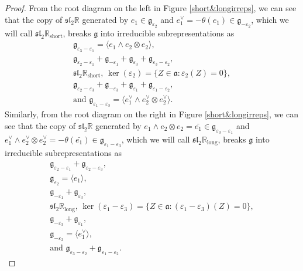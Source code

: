 \documentclass[12pt,a4paper]{amsart}
\theoremstyle{definition}
\begin{document}
\begin{proof}From the root diagram on the left in Figure \ref{short&longirreps}, we can see that the copy of $\mathfrak{sl}_2\mathbb{R}$ generated by $e_1\in\mathfrak{g}_{\varepsilon_2}$ and $e_1^\vee=-\theta(e_1)\in\mathfrak{g}_{-\varepsilon_2}$, which we will call $\mathfrak{sl}_2\mathbb{R}_\text{short}$, breaks $\mathfrak{g}$ into irreducible subrepresentations as
\begin{gather*}\mathfrak{g}_{\varepsilon_3-\varepsilon_1}=\langle e_1\wedge e_2\otimes e_2\rangle, \\
\mathfrak{g}_{\varepsilon_2-\varepsilon_1}+\mathfrak{g}_{-\varepsilon_1}+\mathfrak{g}_{\varepsilon_3}+\mathfrak{g}_{\varepsilon_3-\varepsilon_2}, \\
\mathfrak{sl}_2\mathbb{R}_\text{short},\, \ker(\varepsilon_2)=\{Z\in\mathfrak{a}:\varepsilon_2(Z)=0\}, \\
\mathfrak{g}_{\varepsilon_2-\varepsilon_3}+\mathfrak{g}_{-\varepsilon_3}+\mathfrak{g}_{\varepsilon_1}+\mathfrak{g}_{\varepsilon_1-\varepsilon_2}, \\
\text{and }\mathfrak{g}_{\varepsilon_1-\varepsilon_3}=\langle e_1^\vee\wedge e_2^\vee\otimes e_2^\vee\rangle.\end{gather*}
Similarly, from the root diagram on the right in Figure \ref{short&longirreps}, we can see that the copy of $\mathfrak{sl}_2\mathbb{R}$ generated by $e_1\wedge e_2\otimes e_2=\bar{e_1}\in\mathfrak{g}_{\varepsilon_3-\varepsilon_1}$ and $e_1^\vee\wedge e_2^\vee\otimes e_2^\vee=-\theta(\bar{e_1})\in\mathfrak{g}_{\varepsilon_1-\varepsilon_3}$, which we will call $\mathfrak{sl}_2\mathbb{R}_\text{long}$, breaks $\mathfrak{g}$ into irreducible subrepresentations as
\begin{gather*}\mathfrak{g}_{\varepsilon_2-\varepsilon_1}+\mathfrak{g}_{\varepsilon_2-\varepsilon_3}, \\
\mathfrak{g}_{\varepsilon_2}=\langle e_1\rangle, \\
\mathfrak{g}_{-\varepsilon_1}+\mathfrak{g}_{\varepsilon_3}, \\
\mathfrak{sl}_2\mathbb{R}_\text{long},\, \ker(\varepsilon_1-\varepsilon_3)=\{Z\in\mathfrak{a}:(\varepsilon_1-\varepsilon_3)(Z)=0\}, \\
\mathfrak{g}_{-\varepsilon_3}+\mathfrak{g}_{\varepsilon_1}, \\
\mathfrak{g}_{-\varepsilon_2}=\langle e_1^\vee\rangle, \\
\text{and }\mathfrak{g}_{\varepsilon_3-\varepsilon_2}+\mathfrak{g}_{\varepsilon_1-\varepsilon_2}.\end{gather*}


\end{proof}
\end{document}
